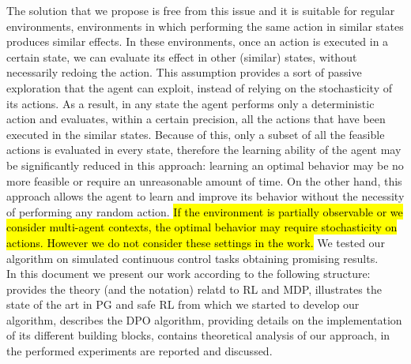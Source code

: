 \newline
The solution that we propose is free from this issue and it is suitable for regular environments, \ie environments in which performing the same action in similar states produces similar effects. In these environments, once an action is executed in a certain state, we can evaluate its effect in other (similar) states, without necessarily redoing the action. This assumption provides a sort of passive exploration that the agent can exploit, instead of relying on the stochasticity of its actions. As a result, in any state the agent performs only a deterministic action and evaluates, within a certain precision, all the actions that have been executed in the similar states. Because of this, only a subset of all the feasible actions is evaluated in every state, therefore the learning ability of the agent may be significantly reduced in this approach: learning an optimal behavior may be no more feasible or require an unreasonable amount of time. On the other hand, this approach allows the agent to learn and improve its behavior without the necessity of performing any random action. \hl{If the environment is partially observable or we consider multi-agent contexts, the optimal behavior may require stochasticity on actions. However we do not consider these settings in the work.} We tested our algorithm on simulated continuous control tasks obtaining promising results.\\
\newline
In this document we present our work according to the following structure:  provides the theory (and the notation) relatd to \acf{RL} and \acf{MDP},  illustrates the state of the art in \acf{PG} and safe \ac{RL} from which we started to develop our algorithm,  describes the \ac{DPO} algorithm, providing details on the implementation of its different building blocks,  contains theoretical analysis of our approach, in  the performed experiments are reported and discussed. 